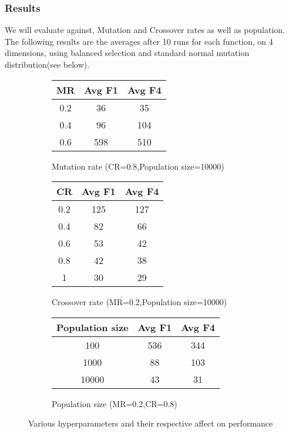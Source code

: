\documentclass[openany]{article}
\begin{document}
			\subsubsection{Results}
			We will evaluate against, Mutation and Crossover rates as well as population. 
			The following results are the averages after 10 runs for each function, on 4 dimensions, using balanced selection and standard normal mutation distribution(see below).
			\begin{figure}[H]
				\centering
				\begin{subfigure}{.5\textwidth}
					\centering
					\begin{center}
						\begin{tabular}{||c c c||} 
							\hline
							MR & Avg F1 & Avg F4 \\ [0.5ex] 
							\hline\hline
							0.2 & 36 & 35 \\ 
							\hline
							0.4 & 96 & 104 \\
							\hline
							0.6 & 598 & 510 \\
							\hline
						\end{tabular}
					\end{center}
					\caption{Mutation rate (CR=0.8,Population size=10000)}
					\label{fig:sub1}
				\end{subfigure}%
				\begin{subfigure}{.5\textwidth}
					\centering
					\begin{center}
						\begin{tabular}{||c c c||} 
							\hline
							CR & Avg F1 & Avg F4 \\ [0.5ex] 
							\hline\hline
							0.2 & 125 & 127 \\ 
							\hline
							0.4 & 82 & 66 \\
							\hline
							0.6 & 53 & 42 \\
							\hline
							0.8 & 42 & 38 \\
							\hline
							1 & 30 & 29 \\
							\hline
						\end{tabular}
					\end{center}
					\caption{Crossover rate (MR=0.2,Population size=10000)}
					\label{fig:sub2}
				\end{subfigure}
				\begin{subfigure}{.5\textwidth}
					\centering
					\begin{center}
						\begin{tabular}{||c c c||} 
							\hline
							Population size & Avg F1 & Avg F4 \\ [0.5ex] 
							\hline\hline
							100 & 536 & 344 \\ 
							\hline
							1000 & 88 & 103 \\
							\hline
							10000 & 43 & 31 \\
							\hline
						\end{tabular}
					\end{center}
					\caption{Population size (MR=0.2,CR=0.8)}
					\label{fig:sub2}
				\end{subfigure}
				\caption{Various hyperparameters and their respective affect on performance}
				\label{fig:test}
			\end{figure}
\end{document}
